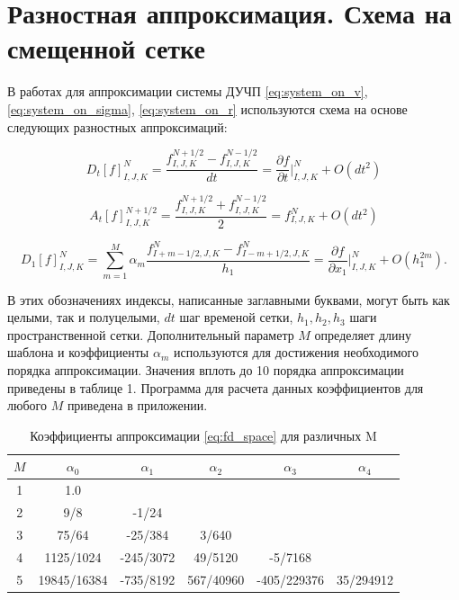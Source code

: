 \documentclass[a4paper, fontsize=14pt]{article}
\begin{document}
\section*{Разностная аппроксимация. Схема на смещенной сетке} 

В работах \cite{Bohlen,Levander} для аппроксимации системы ДУЧП \eqref{eq:system_on_v}, \eqref{eq:system_on_sigma}, \eqref{eq:system_on_r} используются схема на основе следующих разностных  аппроксимаций:

\begin{equation}
    \label{eq:fd_time}
    D_{t}[f]_{I,J,K}^{N}=\frac{f_{I,J,K}^{N+1/2}-f_{I,J,K}^{N-1/2}}{d t}=\frac{\partial f}{\partial t}\bigg|_{I,J,K}^{N}+O(d t^{2})
\end{equation}

\begin{equation}
    \label{eq:fd_f}
    A_{t}[f]_{I,J,K}^{N+1/2}=\frac{f_{I,J,K}^{N+1/2}+f_{I,J,K}^{N-1/2}}{2}=f_{I,J,K}^{N}+O(d t^{2})
\end{equation}


\begin{equation}
    \label{eq:fd_space}
    D_{1}[f]_{I,J,K}^{N}=\sum_{m=1}^{M}\alpha_{m}\frac{f_{I+m-1/2,J,K}^{N}-f_{I-m+1/2,J,K}^{N}}{h_{1}}=\frac{\partial f}{\partial x_{1}}\bigg|_{I,J,K}^{N}+O(h_{1}^{2m}).
\end{equation}

В этих обозначениях индексы, написанные заглавными буквами, могут быть как целыми, так и полуцелыми, $dt$ шаг
временой сетки, $h_1, h_2, h_3$ шаги пространственной сетки. Дополнительный параметр $M$ определяет длину
шаблона и коэффициенты $\alpha_m$ используются для достижения необходимого порядка аппроксимации.
Значения вплоть до 10 порядка аппроксимации приведены в таблице 1. Программа для расчета данных коэффициентов для любого $M$ приведена в приложении.

\begin{table}[htbp]
    \centering
    \begin{tabular}{|c|c|c|c|c|c|}
        \hline
        $M$ & $\alpha_0$ & $\alpha_1$ & $\alpha_2$ & $\alpha_3$ & $\alpha_4$\\
        \hline
        1 & 1.0 & & & & \\
        \hline
        2 & 9/8 & -1/24 & & & \\
        \hline
        3 & 75/64 & -25/384 & 3/640 & & \\
        \hline
        4 & 1125/1024 & -245/3072 & 49/5120 & -5/7168 & \\
        \hline
        5 & 19845/16384 & -735/8192& 567/40960 & -405/229376 & 35/294912 \\
        \hline
    \end{tabular}
    \caption{Коэффициенты аппроксимации \eqref{eq:fd_space} для различных M}
    \label{tab:mytable}
\end{table}
\end{document}
